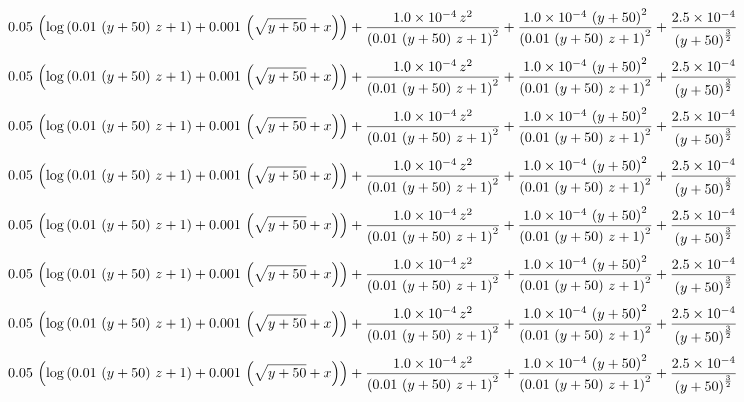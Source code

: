 $$0.05\,\left(\log \left(0.01\,\left(y+50\right)\,z+1\right)+0.001\,
 \left(\sqrt{y+50}+x\right)\right)+{{1.0 \times 10^{-4}\,z^2}\over{
 \left(0.01\,\left(y+50\right)\,z+1\right)^2}}+{{1.0 \times 10^{-4}\,
 \left(y+50\right)^2}\over{\left(0.01\,\left(y+50\right)\,z+1\right)^
 2}}+{{2.5 \times 10^{-4}}\over{\left(y+50\right)^{{{3}\over{2}}}}}$$
$$0.05\,\left(\log \left(0.01\,\left(y+50\right)\,z+1\right)+0.001\,
 \left(\sqrt{y+50}+x\right)\right)+{{1.0 \times 10^{-4}\,z^2}\over{
 \left(0.01\,\left(y+50\right)\,z+1\right)^2}}+{{1.0 \times 10^{-4}\,
 \left(y+50\right)^2}\over{\left(0.01\,\left(y+50\right)\,z+1\right)^
 2}}+{{2.5 \times 10^{-4}}\over{\left(y+50\right)^{{{3}\over{2}}}}}$$
$$0.05\,\left(\log \left(0.01\,\left(y+50\right)\,z+1\right)+0.001\,
 \left(\sqrt{y+50}+x\right)\right)+{{1.0 \times 10^{-4}\,z^2}\over{
 \left(0.01\,\left(y+50\right)\,z+1\right)^2}}+{{1.0 \times 10^{-4}\,
 \left(y+50\right)^2}\over{\left(0.01\,\left(y+50\right)\,z+1\right)^
 2}}+{{2.5 \times 10^{-4}}\over{\left(y+50\right)^{{{3}\over{2}}}}}$$
$$0.05\,\left(\log \left(0.01\,\left(y+50\right)\,z+1\right)+0.001\,
 \left(\sqrt{y+50}+x\right)\right)+{{1.0 \times 10^{-4}\,z^2}\over{
 \left(0.01\,\left(y+50\right)\,z+1\right)^2}}+{{1.0 \times 10^{-4}\,
 \left(y+50\right)^2}\over{\left(0.01\,\left(y+50\right)\,z+1\right)^
 2}}+{{2.5 \times 10^{-4}}\over{\left(y+50\right)^{{{3}\over{2}}}}}$$
$$0.05\,\left(\log \left(0.01\,\left(y+50\right)\,z+1\right)+0.001\,
 \left(\sqrt{y+50}+x\right)\right)+{{1.0 \times 10^{-4}\,z^2}\over{
 \left(0.01\,\left(y+50\right)\,z+1\right)^2}}+{{1.0 \times 10^{-4}\,
 \left(y+50\right)^2}\over{\left(0.01\,\left(y+50\right)\,z+1\right)^
 2}}+{{2.5 \times 10^{-4}}\over{\left(y+50\right)^{{{3}\over{2}}}}}$$
$$0.05\,\left(\log \left(0.01\,\left(y+50\right)\,z+1\right)+0.001\,
 \left(\sqrt{y+50}+x\right)\right)+{{1.0 \times 10^{-4}\,z^2}\over{
 \left(0.01\,\left(y+50\right)\,z+1\right)^2}}+{{1.0 \times 10^{-4}\,
 \left(y+50\right)^2}\over{\left(0.01\,\left(y+50\right)\,z+1\right)^
 2}}+{{2.5 \times 10^{-4}}\over{\left(y+50\right)^{{{3}\over{2}}}}}$$
$$0.05\,\left(\log \left(0.01\,\left(y+50\right)\,z+1\right)+0.001\,
 \left(\sqrt{y+50}+x\right)\right)+{{1.0 \times 10^{-4}\,z^2}\over{
 \left(0.01\,\left(y+50\right)\,z+1\right)^2}}+{{1.0 \times 10^{-4}\,
 \left(y+50\right)^2}\over{\left(0.01\,\left(y+50\right)\,z+1\right)^
 2}}+{{2.5 \times 10^{-4}}\over{\left(y+50\right)^{{{3}\over{2}}}}}$$
$$0.05\,\left(\log \left(0.01\,\left(y+50\right)\,z+1\right)+0.001\,
 \left(\sqrt{y+50}+x\right)\right)+{{1.0 \times 10^{-4}\,z^2}\over{
 \left(0.01\,\left(y+50\right)\,z+1\right)^2}}+{{1.0 \times 10^{-4}\,
 \left(y+50\right)^2}\over{\left(0.01\,\left(y+50\right)\,z+1\right)^
 2}}+{{2.5 \times 10^{-4}}\over{\left(y+50\right)^{{{3}\over{2}}}}}$$
